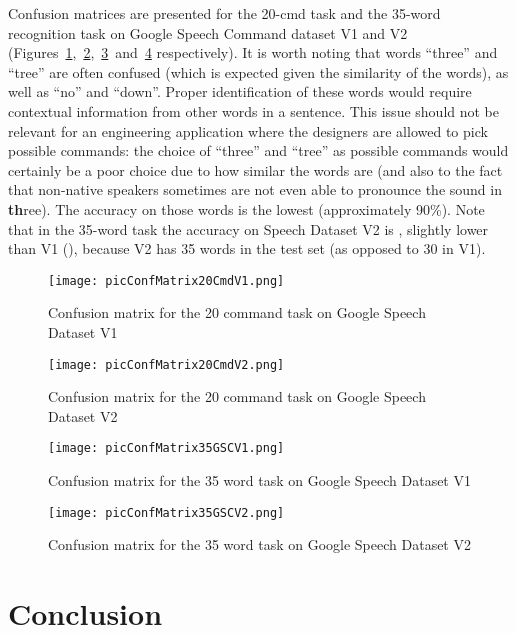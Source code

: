 \documentclass[authoryear, review, 12pt, 3p]{elsarticle}
\begin{document}
Confusion matrices are presented for the 20-cmd task and the 35-word recognition task on Google Speech Command dataset V1 and V2 (Figures~\ref{figConfMatrix20cmdV1},~\ref{figConfMatrix20cmdV2},~\ref{figConfMatrix35V1}~and~\ref{figConfMatrix35V2} respectively). It is worth noting that words ``three'' and ``tree'' are often confused (which is expected given the similarity of the words), as well as ``no'' and ``down''. Proper identification of these words would require contextual information from other words in a sentence. This issue should not be relevant for an engineering application where the designers are allowed to pick possible commands: the choice of ``three'' and ``tree'' as possible commands would certainly be a poor choice due to how similar the words are (and also to the fact that non-native speakers sometimes are not even able to pronounce the  sound in \textbf{th}ree). The accuracy on those words is the lowest (approximately 90\%). Note that in the 35-word task the accuracy on Speech Dataset V2 is , slightly lower than V1 (), because V2 has 35 words in the test set (as opposed to 30 in V1).

\begin{figure}[!ht]
\centering
\texttt{[image: picConfMatrix20CmdV1.png]}
\caption{Confusion matrix for the 20 command task on Google Speech Dataset V1}
\label{figConfMatrix20cmdV1}
\end{figure}

\begin{figure}[!ht]
\centering
\texttt{[image: picConfMatrix20CmdV2.png]}
\caption{Confusion matrix for the 20 command task on Google Speech Dataset V2}
\label{figConfMatrix20cmdV2}
\end{figure}

\begin{figure}[!ht]
\centering
\texttt{[image: picConfMatrix35GSCV1.png]}
\caption{Confusion matrix for the 35 word task on Google Speech Dataset V1}
\label{figConfMatrix35V1}
\end{figure}

\begin{figure}[!ht]
\centering
\texttt{[image: picConfMatrix35GSCV2.png]}
\caption{Confusion matrix for the 35 word task on Google Speech Dataset V2}
\label{figConfMatrix35V2}
\end{figure}


\clearpage

\section{Conclusion}
\label{secConclusion}
\end{document}
